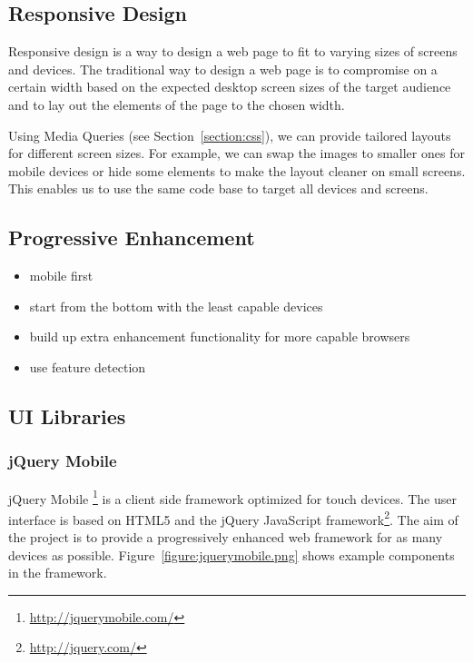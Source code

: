 \subsection{Responsive Design}

Responsive design is a way to design a web page to fit to varying
sizes of screens and devices. The traditional way to design a web page
is to compromise on a certain width based on the expected desktop
screen sizes of the target audience and to lay out the elements of the
page to the chosen width.

Using Media Queries (see Section~\ref{section:css}), we can provide
tailored layouts for different screen sizes. For example, we can swap
the images to smaller ones for mobile devices or hide some elements to
make the layout cleaner on small screens. This enables us to use the
same code base to target all devices and screens.

\subsection{Progressive Enhancement}
\label{subsection:progressive-enhancement}

\begin{itemize}
\item mobile first
\item start from the bottom with the least capable devices
\item build up extra enhancement functionality for more capable browsers
\item use feature detection
\end{itemize}

\subsection{UI Libraries}

\subsubsection{jQuery Mobile}

jQuery Mobile \footnote{\url{http://jquerymobile.com/}} is a client
side framework optimized for touch devices. The user interface is
based on HTML5 and the jQuery JavaScript
framework\footnote{\url{http://jquery.com/}}. The aim of the project
is to provide a progressively enhanced web framework for as many
devices as possible. Figure~\ref{figure:jquerymobile.png} shows
example components in the framework.

